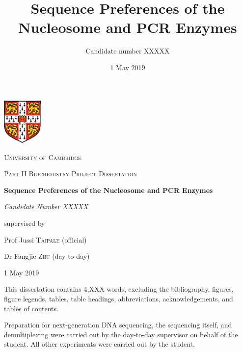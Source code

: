 \documentclass[a4paper, numbers=noenddot]{scrbook}
\title{Sequence Preferences of the Nucleosome and PCR Enzymes}
\author{Candidate number XXXXX}
\date{1 May 2019}
\begin{document}

\frontmatter

\begin{titlepage}
  \centering
  \includegraphics[width=0.15\textwidth]{University_Crest}\par\vspace{1cm}
  {\scshape\LARGE University of Cambridge \par}
  \vspace{0.5cm}
  {\scshape\Large Part II Biochemistry Project Dissertation\par}
  \vspace{1cm}
  {\huge\bfseries Sequence Preferences of the Nucleosome and PCR Enzymes\par}
  \vspace{1.5cm}
  {\Large\itshape Candidate Number XXXXX\par}
  \vfill
  supervised by\par
  Prof Jussi \textsc{Taipale} (official)\par
  Dr Fangjie \textsc{Zhu} (day-to-day)
  \vfill

  {\large 1 May 2019 \par}
  \vfill
  This dissertation contains 4,XXX words, excluding the bibliography, figures, figure legends, tables, table headings, abbreviations, acknowledgements, and tables of contents.
  \end{titlepage}

Preparation for next-generation DNA sequencing, the sequencing itself, and demultiplexing were carried out by the day-to-day supervisor on behalf of the student.  All other experiments were carried out by the student.
  
\end{document}
